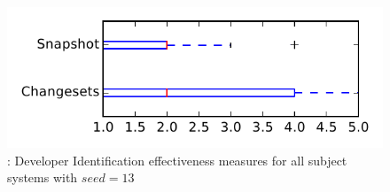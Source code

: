 
\begin{figure}
\centering
\includegraphics[height=0.4\textheight]{figures/dit_seed/rq1_tiny_13}
\caption{\rtwo: Developer Identification effectiveness measures for all subject systems with $seed=13$}
\label{fig:dit_seed:rq1:tiny}
\end{figure}
